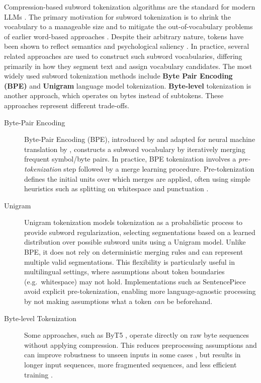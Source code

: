 Compression-based subword tokenization algorithms are the standard for modern LLMs \citep[Chapter 2]{jm3}. The primary motivation for subword tokenization is to shrink the vocabulary to a manageable size and to mitigate the out-of-vocabulary problems of earlier word-based approaches \citep{mielke2021}. Despite their arbitrary nature, tokens have been shown to reflect semantics \citep{haslett2025semantics} and psychological saliency \citep{haslett2025psychological}. In practice, several related approaches are used to construct such subword vocabularies, differing primarily in how they segment text and assign vocabulary candidates. The most widely used subword tokenization methods include \textbf{Byte Pair Encoding (BPE)} and \textbf{Unigram} language model tokenization. \textbf{Byte-level} tokenization is another approach, which operates on bytes instead of subtokens. These approaches represent different trade-offs.

\begin{description}

\item[Byte-Pair Encoding]
Byte-Pair Encoding (BPE), introduced by \citet{bpe2} and adapted for neural machine translation by \citet{bpe}, constructs a subword vocabulary by iteratively merging frequent symbol/byte pairs. In practice, BPE tokenization involves a \textit{pre-tokenization} step followed by a merge learning procedure. Pre-tokenization defines the initial units over which merges are applied, often using simple heuristics such as splitting on whitespace and punctuation \citep{schmidt2025}.


\item[Unigram]
Unigram tokenization \citep{kudo2018} models tokenization as a probabilistic process to provide subword regularization, selecting segmentations based on a learned distribution over possible subword units using a Unigram model. Unlike BPE, it does not rely on deterministic merging rules and can represent multiple valid segmentations. This flexibility is particularly useful in multilingual settings, where assumptions about token boundaries (e.g.\ whitespace) may not hold. Implementations such as SentencePiece \citep{sentencepiece} avoid explicit pre-tokenization, enabling more language-agnostic processing by not making assumptions what a token \textit{can} be beforehand.

\item[Byte-level Tokenization]
Some approaches, such as ByT5 \citep{xue2022}, operate directly on raw byte sequences without applying compression. This reduces preprocessing assumptions and can improve robustness to unseen inputs in some cases \citep{aleph2026}, but results in longer input sequences, more fragmented sequences, and less efficient training \citep{gigant2026}.

\end{description}

